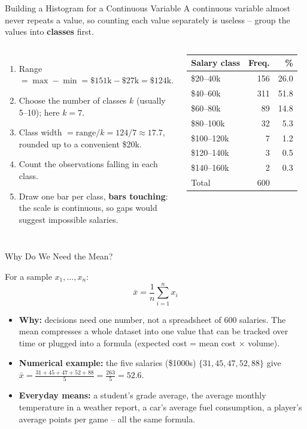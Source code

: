 \begin{frame}{Building a Histogram for a Continuous Variable}
\small
A continuous variable almost never repeats a value, so counting each value separately is useless -- group the values into \textbf{classes} first.
\begin{columns}[T]
\begin{enumerate}
  \item Range $=\max-\min=\$151\text{k}-\$27\text{k}=\$124\text{k}$.
  \pause
  \item Choose the number of classes $k$ (usually 5--10); here $k=7$.
  \pause
  \item Class width $=\text{range}/k=124/7\approx17.7$, rounded up to a convenient \$20k.
  \pause
  \item Count the observations falling in each class.
  \pause
  \item Draw one bar per class, \textbf{bars touching}: the scale is continuous, so gaps would suggest impossible salaries.
\end{enumerate}
\centering
\scriptsize
\begin{tabular}{lrr}
\hline
Salary class & Freq. & \% \\
\hline
\$20--40k   & 156 & 26.0 \\
\$40--60k   & 311 & 51.8 \\
\$60--80k   &  89 & 14.8 \\
\$80--100k  &  32 &  5.3 \\
\$100--120k &   7 &  1.2 \\
\$120--140k &   3 &  0.5 \\
\$140--160k &   2 &  0.3 \\
\hline
Total       & 600 &      \\
\hline
\end{tabular}
\end{columns}
\end{frame}

\begin{frame}{Why Do We Need the Mean?}
\begin{rldefinition}
For a sample $x_1, \dots, x_n$:
\[
\bar{x} = \frac{1}{n}\sum_{i=1}^{n} x_i
\]
\end{rldefinition}
\pause
\begin{itemize}
  \item \textbf{Why:} decisions need one number, not a spreadsheet of 600 salaries. The mean compresses a whole dataset into one value that can be tracked over time or plugged into a formula (expected cost = mean cost $\times$ volume).
  \pause
  \item \textbf{Numerical example:} the five salaries (\$1000s) $\{31, 45, 47, 52, 88\}$ give $\bar{x} = \frac{31+45+47+52+88}{5} = \frac{263}{5} = 52.6$.
  \pause
  \item \textbf{Everyday means:} a student's grade average, the average monthly temperature in a weather report, a car's average fuel consumption, a player's average points per game -- all the same formula.
\end{itemize}
\end{frame}

